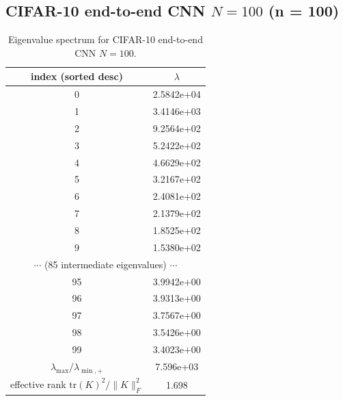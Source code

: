 \subsection*{CIFAR-10 end-to-end CNN $N = 100$ \quad (n = 100)}
\begin{table}[H]
\centering
\caption{Eigenvalue spectrum for CIFAR-10 end-to-end CNN $N = 100$.}
\begin{tabular}{c c}
\toprule
index (sorted desc) & $\lambda$ \\
\midrule
0 & 2.5842e+04 \\
1 & 3.4146e+03 \\
2 & 9.2564e+02 \\
3 & 5.2422e+02 \\
4 & 4.6629e+02 \\
5 & 3.2167e+02 \\
6 & 2.4081e+02 \\
7 & 2.1379e+02 \\
8 & 1.8525e+02 \\
9 & 1.5380e+02 \\
\multicolumn{2}{c}{$\cdots$ (85 intermediate eigenvalues) $\cdots$} \\
95 & 3.9942e+00 \\
96 & 3.9313e+00 \\
97 & 3.7567e+00 \\
98 & 3.5426e+00 \\
99 & 3.4023e+00 \\
\midrule
$\lambda_{\max}/\lambda_{\min, +}$ & 7.596e+03 \\
effective rank $\mathrm{tr}(K)^2/\|K\|_F^2$ & 1.698 \\
\bottomrule
\end{tabular}
\end{table}

